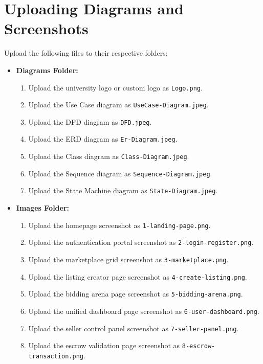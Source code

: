 \documentclass[12pt,a4paper,oneside]{report}
\begin{document}
\section{Uploading Diagrams and Screenshots}
Upload the following files to their respective folders:
\begin{itemize}
    \item \textbf{Diagrams Folder:}
    \begin{enumerate}
        \item Upload the university logo or custom logo as \texttt{Logo.png}.
        \item Upload the Use Case diagram as \texttt{UseCase-Diagram.jpeg}.
        \item Upload the DFD diagram as \texttt{DFD.jpeg}.
        \item Upload the ERD diagram as \texttt{Er-Diagram.jpeg}.
        \item Upload the Class diagram as \texttt{Class-Diagram.jpeg}.
        \item Upload the Sequence diagram as \texttt{Sequence-Diagram.jpeg}.
        \item Upload the State Machine diagram as \texttt{State-Diagram.jpeg}.
    \end{enumerate}
    \item \textbf{Images Folder:}
    \begin{enumerate}
        \item Upload the homepage screenshot as \texttt{1-landing-page.png}.
        \item Upload the authentication portal screenshot as \texttt{2-login-register.png}.
        \item Upload the marketplace grid screenshot as \texttt{3-marketplace.png}.
        \item Upload the listing creator page screenshot as \texttt{4-create-listing.png}.
        \item Upload the bidding arena page screenshot as \texttt{5-bidding-arena.png}.
        \item Upload the unified dashboard page screenshot as \texttt{6-user-dashboard.png}.
        \item Upload the seller control panel screenshot as \texttt{7-seller-panel.png}.
        \item Upload the escrow validation page screenshot as \texttt{8-escrow-transaction.png}.
    \end{enumerate}
\end{itemize}
\end{document}
